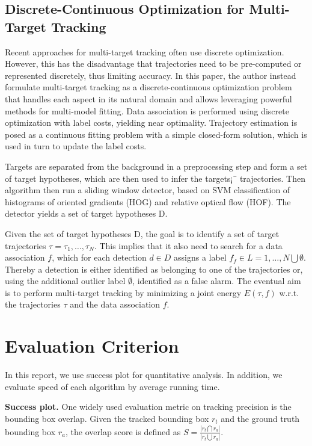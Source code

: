 \documentclass{acm_proc_article-sp}
\begin{document}
\subsection{Discrete-Continuous Optimization for Multi-Target Tracking}
Recent approaches for multi-target tracking often use discrete optimization. However, this has the disadvantage that trajectories need to be pre-computed or represented discretely, thus limiting accuracy. In this paper, the author instead formulate multi-target tracking as a discrete-continuous optimization problem that handles each aspect in its natural domain and allows leveraging powerful methods for multi-model fitting. Data association is performed using discrete optimization with label costs, yielding near optimality. Trajectory estimation is posed as a continuous fitting problem with a simple closed-form solution, which is used in turn to update the label costs.

Targets are separated from the background in a preprocessing step and form a set of target hypotheses, which are then used to infer the targets¡¯ trajectories. Then algorithm then run a sliding window detector, based on SVM classification of histograms of oriented gradients (HOG) and relative optical flow (HOF). The detector yields a set of target hypotheses D.

Given the set of target hypotheses D, the goal is to identify a set of target trajectories $\tau = {\tau_1,\ldots,\tau_N}$. This implies that it also need to search for a data association $f$, which for each detection $d \in D$ assigns a label $f_f \in L = {1,\ldots,N}\bigcup \emptyset$. Thereby a detection is either identified as belonging to one of the trajectories or, using the additional outlier label $\emptyset$, identified as a false alarm.
The eventual aim is to perform multi-target tracking by minimizing a joint energy $E(\tau , f)$ w.r.t. the trajectories $\tau$ and the data association $f$. 


\section{Evaluation Criterion}

In this report, we use success plot for quantitative analysis.
In addition, we evaluate speed of each algorithm by average running time.

\textbf{Success plot.}
One widely used evaluation metric on tracking precision is the bounding box overlap. 
Given the tracked bounding box $r_t$ and the ground truth bounding box $r_a$, the overlap score is defined as $S = \frac{|r_t \bigcap r_a|}{|r_t \bigcup r_a|}$.
\end{document}

